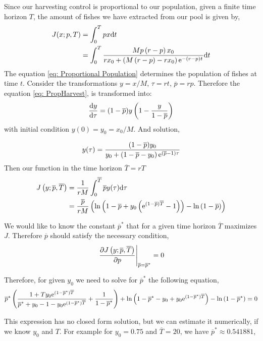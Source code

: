 Since our harvesting control is proportional to our population, given a finite time horizon $T$, the amount of fishes we have extracted from our pool is given by,
\begin{align}
	J(x;p,T)&=\int_{0}^{T} p x \mathrm{d} t \nonumber \\
			&=\int_{0}^{T} \frac{M p\left(r-p\right)x_0}{rx_0+\left(M\left(r-p\right)-rx_0\right)\mathrm{e}^{-(r-p) t}} \mathrm{d} t \nonumber
\end{align}
The equation \ref{eq: Proportional Population} determines the population of fishes at time $t$. Consider the transformations $y=x/M$, $\tau=rt$, $\overline{p}=rp$. Therefore the equation \ref{eq: PropHarvest}, is transformed into:
\begin{equation}
\frac{\mathrm{d} y}{{\mathrm{d} \tau}}=(1-\overline{p})y\left(1-\frac{y}{1-\overline{p}}\right)
\end{equation}
with initial condition $y(0)=y_0=x_0/M$. And solution,

\begin{equation}
	y(\tau)=\frac{(1-\overline p)y_0}{y_0+\left(1-\overline p-y_0\right)\mathrm{e}^{(\overline p-1)\tau}}
\end{equation}
Then our function in the time horizon $\overline{T}=rT$
\begin{align}
J\left(y;\overline{p},\overline{T}\right)&=\frac{1}{rM}\int_0^{\overline{T}}\overline{p}y(\tau)\mathrm{d} \tau	\\
&=\frac{\overline{p}}{rM}\left(\ln\left(1-\overline{p}+y_0\left(\mathrm{e}^{(1-\overline{p})\overline{T}}-1\right)\right)-\ln\left(1-\overline{p}\right)\right)
\end{align}

We would like to know the constant $\overline{p}^*$ that for a given time horizon $\overline{T}$ maximizes $J$. Therefore $\overline{p}$ should satisfy the necessary condition,
\begin{equation}
\left.\frac{\partial J\left(y;\overline{p},\overline{T}\right)}{{\partial p}}\right|_{\overline{p}=\overline{p}^*}=0
\end{equation}

Therefore, for given $y_0$ we need to solve for $\overline{p}^*$ the following equation,
\begin{equation}
\overline{p}^* \left(\frac{1+Ty_0\mathrm{e}^{\left(1-\overline{p}^*\right)\overline{T}}}{\overline{p}^*+y_0-1 -y_0\mathrm{e}^{(1-\overline{p}^*)\overline{T}}}+\frac{1}{1-\overline{p}^*}\right)+\ln
\left(1-\overline{p}^*-y_0 +y_0\mathrm{e}^{(1-\overline{p}^*)\overline{T}}\right)-\ln\left(1-\overline{p}^*\right)=0
\end{equation}

This expression has no closed form solution, but we can estimate it numerically, if we know $y_0$ and $T$. For example for $y_0=0.75$ and $\overline{T}=20$, we have
$\overline{p}^* \approx 0.541881$,


	



